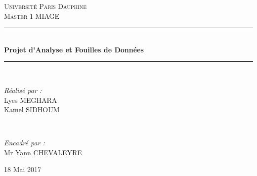 \documentclass[11pt]{article}
\begin{document}

\begin{titlepage}
	\newcommand{\HRule}{\rule{\linewidth}{0.5mm}} 
	
	\center
	
	
	\textsc{\LARGE Université Paris Dauphine}\\[1.5cm] 
	
	\textsc{\Large Master 1 MIAGE}\\[0.5cm] 
	

	
	
	\HRule\\[0.4cm]
	
	{\huge\bfseries Projet d'Analyse et Fouilles de Données}\\[0.4cm]
	
	\HRule\\[1.5cm]
	
	
	\begin{minipage}{0.4\textwidth}
		\begin{flushleft}
			\large
			\textit{Réalisé par :}\\
			Lyes \textsc{MEGHARA}\\ 
			Kamel \textsc{SIDHOUM}\\ 
		\end{flushleft}
	\end{minipage}
	~
	\begin{minipage}{0.4\textwidth}
		\begin{flushright}
			\large
			\textit{Encadré par :}\\
			Mr Yann \textsc{CHEVALEYRE}%

		\end{flushright}
	\end{minipage}
	

	
	
	\vfill\vfill 
	
	{\large18 Mai 2017} 
	




\end{titlepage}
\end{document}
